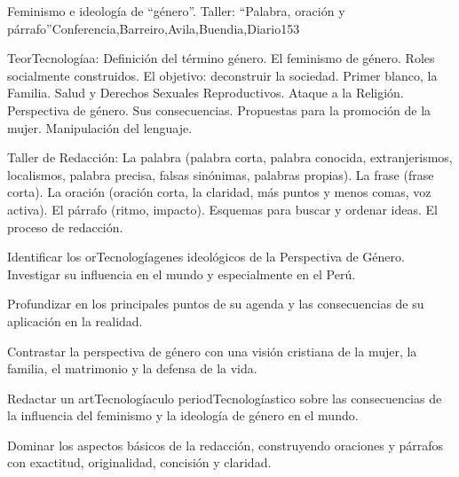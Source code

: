 \begin{syllabus}
\begin{unit}{Feminismo e ideología de ``género''. Taller: ``Palabra, oración y párrafo''}{Conferencia,Barreiro,Avila,Buendia,Diario}{15}{3}
\begin{topics}
	\item TeorTecnologíaa: 
		\subitem Definición del término género. El feminismo de género. Roles socialmente construidos. El objetivo: deconstruir la sociedad. Primer blanco, la Familia. Salud y Derechos Sexuales Reproductivos. Ataque a la Religión.
		\subitem Perspectiva de género. Sus consecuencias. Propuestas para la promoción de la mujer.
		\subitem Manipulación del lenguaje.

	\item Taller de Redacción:
 		\subitem La palabra (palabra corta, palabra conocida, extranjerismos, localismos, palabra precisa, falsas sinónimas, palabras propias).
 		\subitem La frase (frase corta).
 		\subitem La oración (oración corta, la claridad, más puntos y menos comas, voz activa).
 		\subitem El párrafo (ritmo, impacto). 
 		\subitem Esquemas para buscar y ordenar ideas.
 		\subitem El proceso de redacción.
\end{topics}
\begin{unitgoals}
	\item Identificar los orTecnologíagenes ideológicos de la Perspectiva de Género. Investigar su influencia en el mundo y especialmente en el Perú. 	
	\item Profundizar en los principales puntos de su agenda y las consecuencias de su aplicación en la realidad. 	
	\item Contrastar la perspectiva de género con una visión cristiana de la mujer, la familia, el matrimonio y la defensa de la vida.
	\item Redactar un artTecnologíaculo periodTecnologíastico sobre las consecuencias de la influencia del feminismo y la ideología de género en el mundo. 	
	\item Dominar los aspectos básicos de la redacción, construyendo oraciones y párrafos con exactitud, originalidad, concisión y claridad.

\end{unitgoals}
\end{unit}


\end{syllabus}
